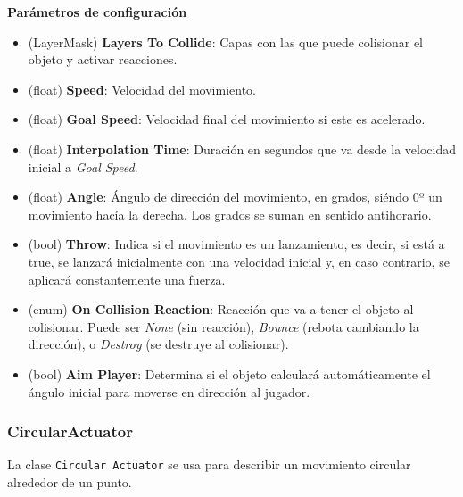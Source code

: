 \textbf{Parámetros de configuración}
\begin{itemize}
	\item (LayerMask) \textbf{Layers To Collide}: Capas con las que puede colisionar el objeto y activar reacciones.
	\item (float) \textbf{Speed}: Velocidad del movimiento.
	\item (float) \textbf{Goal Speed}: Velocidad final del movimiento si este es acelerado.
	\item (float) \textbf{Interpolation Time}: Duración en segundos que va desde la velocidad inicial a \textit{Goal Speed}.
	\item (float) \textbf{Angle}: Ángulo de dirección del movimiento, en grados, siéndo 0º un movimiento hacía la derecha. Los grados se suman en sentido antihorario.
	\item (bool) \textbf{Throw}: Indica si el movimiento es un lanzamiento, es decir, si está a true, se lanzará inicialmente con una velocidad inicial y, en caso contrario, se aplicará constantemente una fuerza.
	\item (enum) \textbf{On Collision Reaction}: Reacción que va a tener el objeto al colisionar. Puede ser \textit{None} (sin reacción), \textit{Bounce} (rebota cambiando la dirección), o \textit{Destroy} (se destruye al colisionar).
	\item (bool) \textbf{Aim Player}: Determina si el objeto calculará automáticamente el ángulo inicial para moverse en dirección al jugador.
\end{itemize}

\subsubsection{CircularActuator}
La clase \texttt{Circular Actuator} se usa para describir un movimiento circular alrededor de un punto.\\

